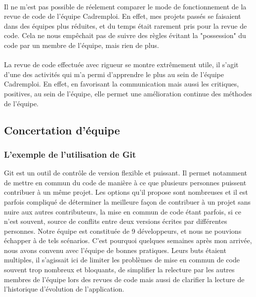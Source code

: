 \paragraph{}
Il ne m'est pas possible de réelement comparer le mode de fonctionnement de la revue de code de l'équipe Cadremploi.
En effet, mes projets passés se faisaient dans des équipes plus réduites, et du temps était rarement pris pour la revue de code.
Cela ne nous empêchait pas de suivre des règles évitant la "possession" du code par un membre de l'équipe, mais rien de plus.
\paragraph{}
La revue de code effectuée avec rigueur se montre extrêmement utile, il s'agit d'une des activités qui m'a permi d'apprendre le plus au sein de l'équipe Cadremploi.
En effet, en favorisant la communication mais aussi les critiques, positives, au sein de l'équipe, elle permet une amélioration continue des méthodes de l'équipe.

\subsection{Concertation d'équipe}
\label{sub:Concertation d'équipe}
\subsubsection{L'exemple de l'utilisation de Git}
\label{subs:Utilisation de Git}
Git est un outil de contrôle de version flexible et puissant.
Il permet notamment de mettre en commun du code de manière à ce que plusieurs personnes puissent contribuer à un même projet.
Les options qu'il propose sont nombreuses et il est parfois compliqué de déterminer la meilleure façon de contribuer à un projet sans nuire aux autres contributeurs, la mise en commun de code étant parfois, si ce n'est souvent, source de conflits entre deux versions écrites par différentes personnes.
Notre équipe est constituée de 9 développeurs, et nous ne pouvions échapper à de tels scénarios.
C'est pourquoi quelques semaines après mon arrivée, nous avons convenu avec l'équipe de bonnes pratiques.
Leurs buts étaient multiples, il s'agissait ici de limiter les problèmes de mise en commun de code souvent trop nombreux et bloquants, de simplifier la relecture par les autres membres de l'équipe lors des revues de code mais aussi de clarifier la lecture de l'historique d'évolution de l'application.
